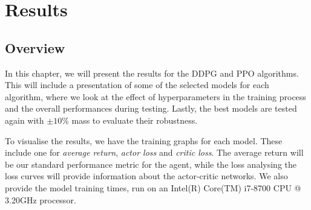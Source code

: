 \chapter{Results}
\label{chap:results}

\section{Overview}

In this chapter, we will present the results for the DDPG and PPO algorithms. This will include a presentation of some of the selected models for each algorithm, where we look at the effect of hyperparameters in the training process and the overall performances during testing. Lastly, the best models are tested again with $\pm10\%$ mass to evaluate their robustness.

To visualise the results, we have the training graphs for each model. These include one for \textit{average return}, \textit{actor loss} and \textit{critic loss}. The average return will be our standard performance metric for the agent, while the loss analysing the loss curves will provide information about the actor-critic networks. We also provide the model training times, run on an Intel(R) Core(TM) i7-8700 CPU @ 3.20GHz processor.


